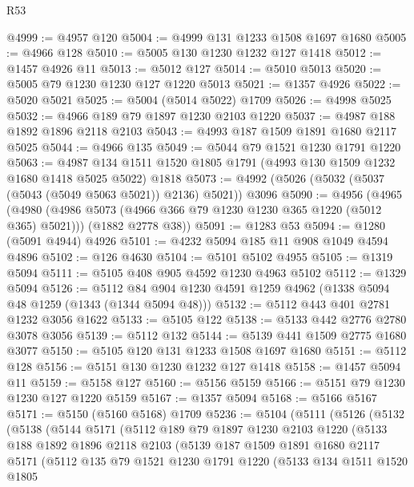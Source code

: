 \begin{lexlean}{R53}
\begin{coremodule}
@4999 := @4957 @120
@5004 := @4999 @131 @1233 @1508 @1697 @1680
@5005 := @4966 @128
@5010 := @5005 @130 @1230 @1232 @127 @1418
@5012 := @1457 @4926 @11
@5013 := @5012 @127
@5014 := @5010 @5013
@5020 := @5005 @79 @1230 @1230 @127 @1220 @5013
@5021 := @1357 @4926
@5022 := @5020 @5021
@5025 := @5004 (@5014 @5022) @1709
@5026 := @4998 @5025
@5032 := @4966 @189 @79 @1897 @1230 @2103 @1220
@5037 := @4987 @188 @1892 @1896 @2118 @2103
@5043 := @4993 @187 @1509 @1891 @1680 @2117 @5025
@5044 := @4966 @135
@5049 := @5044 @79 @1521 @1230 @1791 @1220
@5063 := @4987 @134 @1511 @1520 @1805 @1791 (@4993 @130 @1509 @1232 @1680 @1418 @5025 @5022) @1818
@5073 := @4992 (@5026 (@5032 (@5037 (@5043 (@5049 @5063 @5021)) @2136) @5021)) @3096
@5090 := @4956
    (@4965
      (@4980 (@4986 @5073 (@4966 @366 @79 @1230 @1230 @365 @1220 (@5012 @365) @5021)))
      (@1882 @2778 @38))
@5091 := @1283 @53
@5094 := @1280 (@5091 @4944) @4926
@5101 := @4232 @5094 @185 @11 @908 @1049 @4594 @4896
@5102 := @126 @4630
@5104 := @5101 @5102 @4955
@5105 := @1319 @5094
@5111 := @5105 @408 @905 @4592 @1230 @4963 @5102
@5112 := @1329 @5094
@5126 := @5112 @84 @904 @1230 @4591 @1259 @4962 (@1338 @5094 @48 @1259 (@1343 (@1344 @5094 @48)))
@5132 := @5112 @443 @401 @2781 @1232 @3056 @1622
@5133 := @5105 @122
@5138 := @5133 @442 @2776 @2780 @3078 @3056
@5139 := @5112 @132
@5144 := @5139 @441 @1509 @2775 @1680 @3077
@5150 := @5105 @120 @131 @1233 @1508 @1697 @1680
@5151 := @5112 @128
@5156 := @5151 @130 @1230 @1232 @127 @1418
@5158 := @1457 @5094 @11
@5159 := @5158 @127
@5160 := @5156 @5159
@5166 := @5151 @79 @1230 @1230 @127 @1220 @5159
@5167 := @1357 @5094
@5168 := @5166 @5167
@5171 := @5150 (@5160 @5168) @1709
@5236 := @5104
    (@5111
      (@5126
        (@5132
          (@5138
            (@5144
              @5171
              (@5112
                @189
                @79
                @1897
                @1230
                @2103
                @1220
                (@5133
                  @188
                  @1892
                  @1896
                  @2118
                  @2103
                  (@5139
                    @187
                    @1509
                    @1891
                    @1680
                    @2117
                    @5171
                    (@5112
                      @135
                      @79
                      @1521
                      @1230
                      @1791
                      @1220
                      (@5133
                        @134
                        @1511
                        @1520
                        @1805

\end{coremodule}
\end{lexlean}
